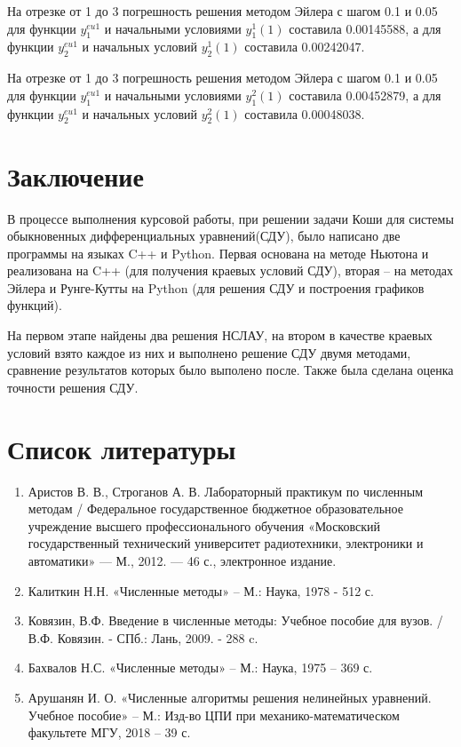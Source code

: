 \documentclass[a4paper,12pt]{article}
\begin{document}
На отрезке от 1 до 3 погрешность решения методом Эйлера с шагом 0.1 и 0.05  для функции $ y^{eu1}_{1} $ и начальными условиями $ y^{1}_{1}(1)$ составила 0.00145588, а для функции $ y^{eu1}_{2} $ и начальных условий $ y^{1}_{2}(1) $ составила 0.00242047.

На отрезке от 1 до 3 погрешность решения методом Эйлера с шагом 0.1 и 0.05  для функции $ y^{eu1}_{1} $ и начальными условиями $ y^{2}_{1}(1)$ составила 0.00452879, а для функции $ y^{eu1}_{2} $ и начальных условий $ y^{2}_{2}(1) $ составила 0.00048038.
\clearpage

\section{Заключение}
В процессе выполнения курсовой работы, при решении задачи Коши для системы обыкновенных дифференциальных уравнений(СДУ), было написано две программы на языках C++ и Python. Первая основана на методе Ньютона и реализована на C++ (для получения краевых условий СДУ), вторая – на методах Эйлера и Рунге-Кутты на Python  (для решения СДУ и построения графиков функций).

На первом этапе найдены два решения НСЛАУ, на втором в качестве краевых условий взято каждое из них и выполнено решение СДУ двумя методами, сравнение результатов которых было выполено после. Также была сделана оценка точности решения СДУ.
\clearpage

\section{Список литературы}
\begin{enumerate}
	
	\item Аристов В. В., Строганов А. В. Лабораторный практикум по численным методам / Федеральное государственное бюджетное образовательное учреждение высшего профессионального обучения «Московский государственный технический университет радиотехники, электроники и автоматики» — М., 2012. — 46 с., электронное издание.
	
	\item Калиткин Н.Н. «Численные методы» – М.: Наука, 1978 - 512 с.
	
	\item Ковязин, В.Ф. Введение в численные методы: Учебное пособие для вузов. / В.Ф. Ковязин. - СПб.: Лань, 2009. - 288 c.	
	
	\item Бахвалов Н.С. «Численные методы» – М.: Наука, 1975 – 369 с.
	
	\item  Арушанян И. О. «Численные алгоритмы решения нелинейных уравнений. Учебное пособие» – М.: Изд-во ЦПИ при механико-математическом факультете МГУ, 2018 – 39 с.
	
\end{enumerate}




\end{document}

